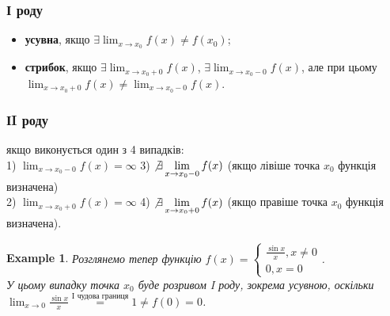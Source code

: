 \documentclass[a4paper, 14pt]{article}
\theoremstyle{theoremdd}
\theoremstyle{theoremdd}
\theoremstyle{theoremdd}
\theoremstyle{theoremdd}
\newtheorem{example}[theorem]{Example}
\theoremstyle{theoremdd}
\theoremstyle{theoremdd}
\theoremstyle{theoremdd}
\theoremstyle{theoremdd}
\begin{document}
\subsubsection*{І роду}
\begin{itemize}[nosep,wide=0pt,label={-}]
\item \textbf{усувна}, якщо $\exists \displaystyle \lim_{x \to x_0} f(x) \neq f(x_0)$;
\item \textbf{стрибок}, якщо $\exists \displaystyle \lim_{x \to x_0+0} f(x)$, $\exists \displaystyle \lim_{x \to x_0-0} f(x)$, але при цьому $\displaystyle \lim_{x \to x_0+0} f(x) \neq \lim_{x \to x_0-0} f(x)$.
\end{itemize}

\subsubsection*{ІI роду}
якщо виконується один з 4 випадків:\\
1) $\displaystyle \lim_{x \to x_0-0} f(x) = \infty$ \hspace{2cm} 3) $\displaystyle \not\exists \lim_{x \to x_0-0} f(x)$ (якщо лівіше точка $x_0$ функція визначена)\\
2) $\displaystyle \lim_{x \to x_0+0} f(x) = \infty$ \hspace{2cm} 4) $\displaystyle \not\exists \lim_{x \to x_0+0} f(x)$ (якщо правіше точка $x_0$ функція визначена).

\begin{example}
Розглянемо тепер функцію $f(x) = \begin{cases} \displaystyle \frac{\sin x}{x}, x \neq 0 \\ 0, x = 0 \end{cases}$.\\
У цьому випадку точка $x_0$ буде розривом I роду, зокрема усувною, оскільки\\
$\displaystyle \lim_{x \to 0} \frac{\sin x}{x} \overset{\textrm{I чудова границя}}{=} 1 \neq f(0) = 0$.
\\ \iffalse %
\begin{figure} [H]
\centering
\resizebox{1\textwidth}{!}
{
\begin{tikzpicture}

\draw[thick, ->] (-7,0)--(7.5,0) node[anchor = north] {$x$};
\draw[thick, ->] (0,-1)--(0,2) node[anchor = east] {$y$};

\draw[thick, domain=-7:7, variable=\x, samples = 1000] plot({\x}, {sin(deg(\x))/\x}) node[anchor = south east, scale = 0.8] {$f(x) = \dfrac{\sin x}{x}$};
\node[white] at (0,1) [circle,fill,inner sep=1.5pt, draw = black]{};
\node[black] at (0,0) [circle,fill,inner sep=1.5pt, draw = black]{};
\end{tikzpicture}
}
\end{figure}
\fi %
\end{example}
\end{document}
